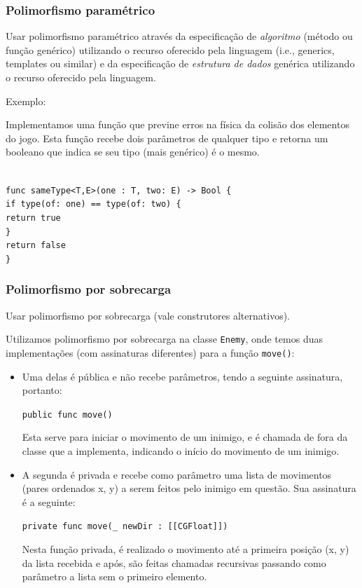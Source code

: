 \documentclass[rel_mlp]{iiufrgs}
\newcommand\tab[1][1cm]{\hspace*{#1}}
\begin{document}

\subsubsection{Polimorfismo paramétrico}

Usar polimorfismo paramétrico através da especificação de \textit{algoritmo} (método ou função genérico) utilizando o recurso oferecido pela linguagem (i.e., generics, templates ou similar) e da especificação de \textit{estrutura de dados} genérica utilizando o recurso oferecido pela linguagem.

Exemplo:

Implementamos uma função que previne erros na física da colisão dos elementos do jogo. Esta função recebe dois parâmetros de qualquer tipo e retorna um booleano que indica se seu tipo (mais genérico) é o mesmo.

\texttt{\\func sameType<T,E>(one : T, two: E) -> Bool \{\\\tab if type(of: one) == type(of: two) \{\\\tab \tab return true\\\tab\}\\\tab return false\\\}}



\subsubsection{Polimorfismo por sobrecarga}

Usar polimorfismo por sobrecarga (vale construtores alternativos).

Utilizamos polimorfismo por sobrecarga na classe \texttt{Enemy}, onde temos duas implementações (com assinaturas diferentes) para a função \texttt{move()}:

\begin{itemize}
\setlength{\itemindent}{1em}
    \item Uma delas é pública e não recebe parâmetros, tendo a seguinte assinatura, portanto:
    
    \texttt{public func move()}
    
    Esta serve para iniciar o movimento de um inimigo, e é chamada de fora da classe que a implementa, indicando o início do movimento de um inimigo.
    
    \item A segunda é privada e recebe como parâmetro uma lista de movimentos (pares ordenados x, y) a serem feitos pelo inimigo em questão. Sua assinatura é a seguinte:
    
    \texttt{private func move(\_ newDir : [[CGFloat]])}
    
    Nesta função privada, é realizado o movimento até a primeira posição (x, y) da lista recebida e após, são feitas chamadas recursivas passando como parâmetro a lista sem o primeiro elemento.
\end{itemize}
\end{document}
